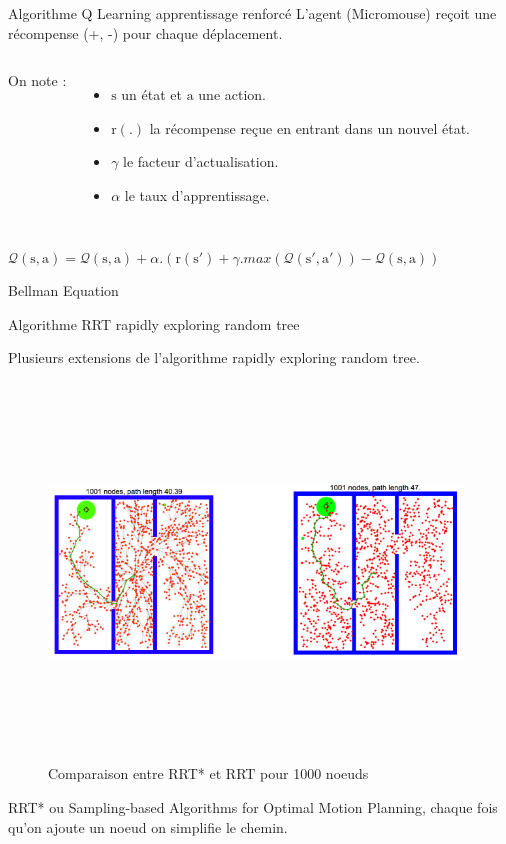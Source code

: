 \documentclass{beamer}
\begin{document}
\begin{frame}{Algorithme Q Learning apprentissage renforcé}
L'agent (Micromouse) reçoit une récompense (+, -) pour chaque déplacement.

\begin{columns}[c]


On note :
\begin{itemize}
    \item $\mathrm{s}$ un état et $\mathrm{a}$ une action.
    \item $\mathrm{r(.)}$ la récompense reçue en entrant dans un nouvel état.
    \item $\gamma$ le facteur d'actualisation.
    \item $\alpha$ le taux d'apprentissage.
\end{itemize}

\end{columns}

\begin{center}
\large{
$\mathcal{Q}(\mathrm{s},\mathrm{a}) = \mathcal{Q}(\mathrm{s},\mathrm{a}) + \alpha . (\mathrm{r}(\mathrm{s'}) + \gamma . max(\mathcal{Q}(\mathrm{s'},\mathrm{a'})) - \mathcal{Q}(\mathrm{s},\mathrm{a}))$}

\color{red}
Bellman Equation
\end{center}

\end{frame}

\begin{frame}{Algorithme RRT rapidly exploring random tree}

Plusieurs extensions de l'algorithme rapidly exploring random tree.

\begin{figure}
    \centering
    \includegraphics[width=11cm,height=10cm,keepaspectratio]{pics/rrt_rrtstar.png}
    \caption{Comparaison entre RRT* et RRT pour 1000 noeuds}
\end{figure}

RRT* ou Sampling-based Algorithms for Optimal Motion Planning, chaque fois qu'on ajoute un noeud on simplifie le chemin.

\end{frame}
\end{document}
